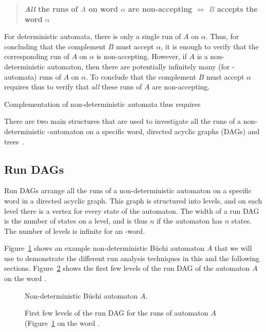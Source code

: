 \begin{quote}
\centering
\textbf{\textit{All} the runs of $A$ on word $\alpha$ are non-accepting $\Longleftrightarrow$ $B$ accepts the word $\alpha$}
\end{quote}

For deterministic automata, there is only a single run of $A$ on $\alpha$. Thus, for concluding that the complement $B$ must accept $\alpha$, it is enough to verify that the corresponding run of $A$ on $\alpha$ is non-accepting. However, if $A$ is a non-deterministic automaton, then there are potentially infinitely many (for \om-automata) runs of $A$ on $\alpha$. To conclude that the complement $B$ must accept $\alpha$ requires thus to verify that \textit{all} these runs of $A$ are non-accepting.

Complementation of non-deterministic automata thus requires 

There are two main structures that are used to investigate all the runs of a non-deterministic \om-automaton on a specific word, directed acyclic graphs (DAGs) and trees~\cite{2014_wilke}. 

\subsection{Run DAGs}
Run DAGs arrange all the runs of a non-deterministic automaton on a specific word in a directed acyclic graph. This graph is structured into levels, and on each level there is a vertex for every state of the automaton. The width of a run DAG is the number of states on a level, and is thus $n$ if the automaton has $n$ states. The number of levels is infinite for an \om-word.

Figure~\ref{example_automaton_1} shows an example non-deterministic Büchi automaton $A$ that we will use to demonstrate the different run analysis techniques in this and the following sections. Figure~\ref{run_dag} shows the first few levels of the run DAG of the automaton $A$ on the word \aom. 

\begin{figure}
\centering
\Automaton
\caption{Non-deterministic Büchi automaton $A$.}
\label{example_automaton_1}
\end{figure}

\begin{figure}
\centering
\RunDAG
\caption{First few levels of the run DAG for the runs of automaton $A$ (Figure~\ref{example_automaton_1} on the word \aom.}
\label{run_dag}
\end{figure}

